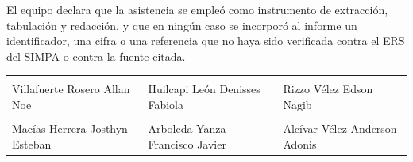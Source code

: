 \vspace{0.4cm}
\noindent\small
El equipo declara que la asistencia se empleó como instrumento de extracción, tabulación y redacción,
y que en ningún caso se incorporó al informe un identificador, una cifra o una referencia que no haya
sido verificada contra el ERS del SIMPA o contra la fuente citada.\normalsize

\vspace{1.2cm}
\noindent\begin{tabular}{p{4.8cm} p{4.8cm} p{4.8cm}}
\hrulefill & \hrulefill & \hrulefill\\
\footnotesize Villafuerte Rosero Allan Noe & \footnotesize Huilcapi León Denisses Fabiola & \footnotesize Rizzo Vélez Edson Nagib\\[1.4cm]
\hrulefill & \hrulefill & \hrulefill\\
\footnotesize Macías Herrera Josthyn Esteban & \footnotesize Arboleda Yanza Francisco Javier & \footnotesize Alcívar Vélez Anderson Adonis\\
\end{tabular}
